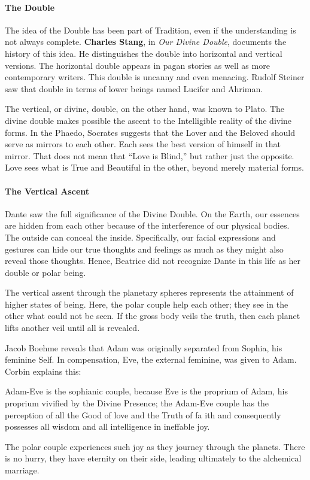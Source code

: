 \paragraph{The Double}
The idea of the Double has been part of Tradition, even if the understanding is not always complete. \textbf{Charles Stang}, in \emph{Our Divine Double}, documents the history of this idea. He distinguishes the double into horizontal and vertical versions. The horizontal double appears in pagan stories as well as more contemporary writers. This double is uncanny and even menacing. Rudolf Steiner saw that double in terms of lower beings named Lucifer and Ahriman.

The vertical, or divine, double, on the other hand, was known to Plato. The divine double makes possible the ascent to the Intelligible reality of the divine forms. In the Phaedo, Socrates suggests that the Lover and the Beloved should serve as mirrors to each other. Each sees the best version of himself in that mirror. That does not mean that “Love is Blind,” but rather just the opposite. Love sees what is True and Beautiful in the other, beyond merely material forms.

\paragraph{The Vertical Ascent}
Dante saw the full significance of the Divine Double. On the Earth, our essences are hidden from each other because of the interference of our physical bodies. The outside can conceal the inside. Specifically, our facial expressions and gestures can hide our true thoughts and feelings as much as they might also reveal those thoughts. Hence, Beatrice did not recognize Dante in this life as her double or polar being.

The vertical assent through the planetary spheres represents the attainment of higher states of being. Here, the polar couple help each other; they see in the other what could not be seen. If the gross body veils the truth, then each planet lifts another veil until all is revealed.

Jacob Boehme reveals that Adam was originally separated from Sophia, his feminine Self. In compensation, Eve, the external feminine, was given to Adam. Corbin explains this:

\begin{quotex}
Adam-Eve is the sophianic couple, because Eve is the proprium of Adam, his proprium vivified by the Divine Presence; the Adam-Eve couple has the perception of all the Good of love and the Truth of fa ith and consequently possesses all wisdom and all intelligence in ineffable joy.

\end{quotex}
The polar couple experiences such joy as they journey through the planets. There is no hurry, they have eternity on their side, leading ultimately to the alchemical marriage.




